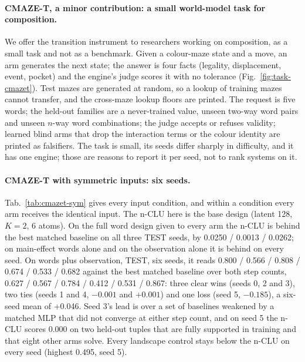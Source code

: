 \documentclass{article} %
\begin{document}
\paragraph{CMAZE-T, a minor contribution: a small world-model task for composition.} We offer the
transition instrument to researchers working on composition, as a small task and not as a benchmark.
Given a colour-maze state and a move, an arm generates the next state; the answer is four facts
(legality, displacement, event, pocket) and the engine's judge scores it with no tolerance
(Fig.~\ref{fig:task-cmazet}). Test mazes are generated at random, so a lookup of training mazes
cannot transfer, and the cross-maze lookup floors are printed. The request is five words; the
held-out families are a never-trained value, unseen two-way word pairs and unseen $n$-way word
combinations; the judge accepts or refuses validity; learned blind arms that drop the interaction
terms or the colour identity are printed as falsifiers. The task is small, its seeds differ sharply in difficulty, and it has one engine; those are
reasons to report it per seed, not to rank systems on it.

\paragraph{CMAZE-T with symmetric inputs: six seeds.}
Tab.~\ref{tab:cmazet-sym} gives every input condition, and within a condition every arm receives the
identical input. The n-CLU here is the base design (latent 128, $K=2$, 6 atoms). On the full word design given %
to every arm the n-CLU is behind the best matched baseline on all three TEST seeds, by 0.0250 / 0.0013 /
0.0262; on main-effect words alone and on the observation alone it is behind on every seed. On words
plus observation, TEST, six seeds, it reads 0.800 / 0.566 / 0.808 / 0.674 / 0.533 / 0.682 against the
best matched baseline over both step counts, 0.627 / 0.567 / 0.784 / 0.412 / 0.531 / 0.867: three
clear wins (seeds 0, 2 and 3), two ties (seeds 1 and 4, $-0.001$ and $+0.001$) and
one loss (seed 5, $-0.185$), a six-seed mean of +0.046. Seed 3's lead is over a set of baselines weakened
by a matched MLP that did not converge at either step count, and on seed 5 the n-CLU scores 0.000 on two
held-out tuples that are fully supported in training and that eight other arms solve. Every landscape
control stays below the n-CLU on every seed (highest 0.495, seed 5).
\end{document}
